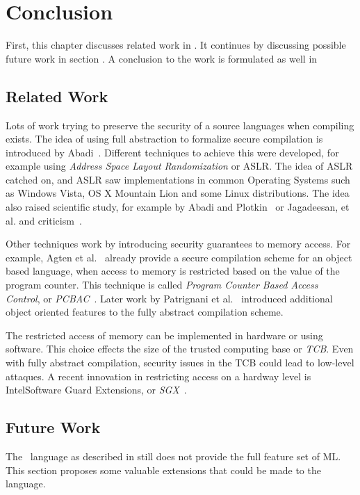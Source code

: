 \chapter{Conclusion}
\label{chap:conclusion}
First, this chapter discusses related work in .
It continues by discussing possible future work in section .
A conclusion to the work is formulated as well in 

\section{Related Work}
\label{sec:relatedwork}
Lots of work trying to preserve the security of a source languages when compiling exists.
The idea of using full abstraction to formalize secure compilation is introduced by Abadi~\cite{Abadi}.
Different techniques to achieve this were developed, for example using \emph{Address Space Layout Randomization} or ASLR.
The idea of ASLR catched on, and ASLR saw implementations in common Operating Systems such as Windows Vista, OS X Mountain Lion and some Linux distributions. 
The idea also raised scientific study, for example by Abadi and Plotkin~\cite{AbadiASLR} or Jagadeesan, et al.\cite{Jagadeesan} and criticism~\cite{Shacham:2004:EAR:1030083.1030124,Strackx:2009:BMS:1519144.1519145}.

Other techniques work by introducing security guarantees to memory access.
For example, Agten et al.~\cite{Agten:2012:SCM:2354412.2355247} already provide a secure compilation scheme for an object based language, when access to memory is restricted based on the value of the program counter. This technique is called \emph{Program Counter Based Access Control}, or \emph{PCBAC}~\cite{PCBAC}.
Later work by Patrignani et al.~\cite{Patrignani} introduced additional object oriented features to the fully abstract compilation scheme.

The restricted access of memory can be implemented in hardware\cite{Sancus,SGX} or using software\cite{Fides,Salus}.
This choice effects the size of the trusted computing base or \emph{TCB}.
Even with fully abstract compilation, security issues in the TCB could lead to low-level attaques.
A recent innovation in restricting access on a hardway level is Intel\textregistered Software Guard Extensions, or \emph{SGX}~\cite{SGX}.

\section{Future Work}
\label{sec:FutureWork}
The \MiniML\ language as described in  still does not provide the full feature set of ML. This section proposes some valuable extensions that could be made to the language.

